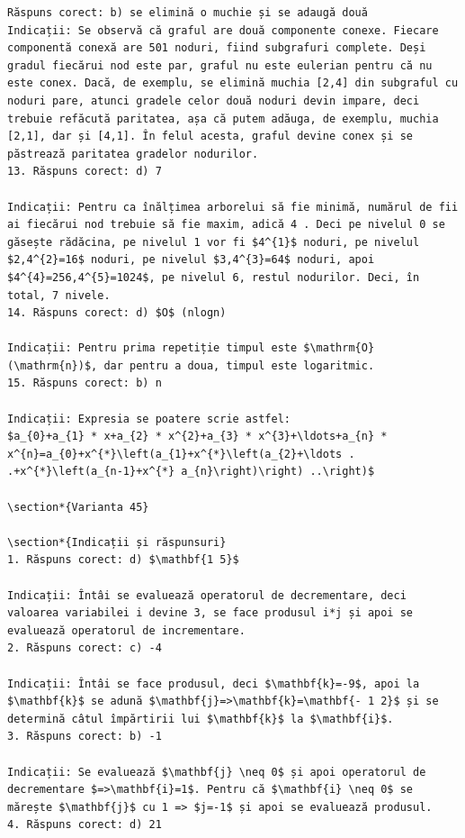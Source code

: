 \documentclass[10pt]{article}
\begin{document}
\begin{verbatim}
Răspuns corect: b) se elimină o muchie și se adaugă două
Indicații: Se observă că graful are două componente conexe. Fiecare componentă conexă are 501 noduri, fiind subgrafuri complete. Deși gradul fiecărui nod este par, graful nu este eulerian pentru că nu este conex. Dacă, de exemplu, se elimină muchia [2,4] din subgraful cu noduri pare, atunci gradele celor două noduri devin impare, deci trebuie refăcută paritatea, așa că putem adăuga, de exemplu, muchia [2,1], dar și [4,1]. În felul acesta, graful devine conex și se păstrează paritatea gradelor nodurilor.
13. Răspuns corect: d) 7

Indicații: Pentru ca înălțimea arborelui să fie minimă, numărul de fii ai fiecărui nod trebuie să fie maxim, adică 4 . Deci pe nivelul 0 se găsește rădăcina, pe nivelul 1 vor fi $4^{1}$ noduri, pe nivelul $2,4^{2}=16$ noduri, pe nivelul $3,4^{3}=64$ noduri, apoi $4^{4}=256,4^{5}=1024$, pe nivelul 6, restul nodurilor. Deci, în total, 7 nivele.
14. Răspuns corect: d) $O$ (nlogn)

Indicații: Pentru prima repetiție timpul este $\mathrm{O}(\mathrm{n})$, dar pentru a doua, timpul este logaritmic.
15. Răspuns corect: b) n

Indicații: Expresia se poatere scrie astfel:
$a_{0}+a_{1} * x+a_{2} * x^{2}+a_{3} * x^{3}+\ldots+a_{n} * x^{n}=a_{0}+x^{*}\left(a_{1}+x^{*}\left(a_{2}+\ldots . .+x^{*}\left(a_{n-1}+x^{*} a_{n}\right)\right) ..\right)$

\section*{Varianta 45}

\section*{Indicații și răspunsuri}
1. Răspuns corect: d) $\mathbf{1 5}$

Indicații: Întâi se evaluează operatorul de decrementare, deci valoarea variabilei i devine 3, se face produsul i*j și apoi se evaluează operatorul de incrementare.
2. Răspuns corect: c) -4

Indicații: Întâi se face produsul, deci $\mathbf{k}=-9$, apoi la $\mathbf{k}$ se adună $\mathbf{j}=>\mathbf{k}=\mathbf{- 1 2}$ și se determină câtul împărtirii lui $\mathbf{k}$ la $\mathbf{i}$.
3. Răspuns corect: b) -1

Indicații: Se evaluează $\mathbf{j} \neq 0$ și apoi operatorul de decrementare $=>\mathbf{i}=1$. Pentru că $\mathbf{i} \neq 0$ se mărește $\mathbf{j}$ cu 1 => $j=-1$ și apoi se evaluează produsul.
4. Răspuns corect: d) 21


\end{verbatim}
\end{document}
